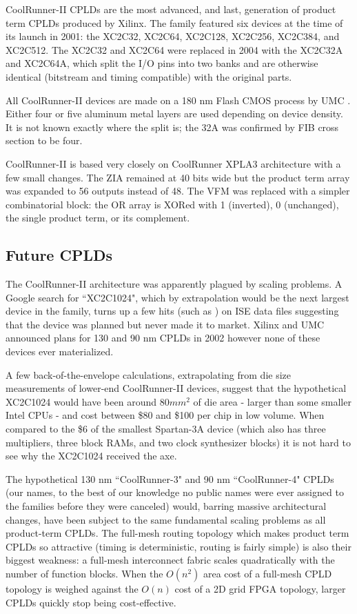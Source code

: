 \documentclass[pdftex,letterpaper]{article}
\begin{document}
CoolRunner-II CPLDs are the most advanced, and last, generation of product term CPLDs produced by Xilinx. The 
family featured six devices at the time of its launch in 2001: the XC2C32, XC2C64, XC2C128, XC2C256, XC2C384, 
and XC2C512. The XC2C32 and XC2C64 were replaced in 2004 with the XC2C32A and XC2C64A, which split the I/O pins 
into two banks and are otherwise identical (bitstream and timing compatible) with the original parts.

All CoolRunner-II devices are made on a 180 nm Flash CMOS process by UMC \cite{backgrounder}. Either four or five
aluminum metal layers are used depending on device density. It is not known exactly where the split is; the 32A was 
confirmed by FIB cross section to be four.

CoolRunner-II is based very closely on CoolRunner XPLA3 architecture with a few small changes. The ZIA remained at 
40 bits wide but the product term array was expanded to 56 outputs instead of 48. The VFM was replaced with a simpler 
combinatorial block: the OR array is XORed with 1 (inverted), 0 (unchanged), the single product term, or its 
complement.

\subsection{Future CPLDs}

The CoolRunner-II architecture was apparently plagued by scaling problems. A Google search for ``XC2C1024", 
which by extrapolation would be the next largest device in the family, turns up a few hits (such as \cite
{epldmodel}) on ISE data files suggesting that the device was planned but never made it to market. Xilinx and 
UMC announced plans for 130 and 90 nm CPLDs in 2002 \cite{roadmap} however none of these devices ever 
materialized.

A few back-of-the-envelope calculations, extrapolating from die size measurements of lower-end CoolRunner-II 
devices, suggest that the hypothetical XC2C1024 would have been around $80 mm^2$ of die area - larger than some 
smaller Intel CPUs - and cost between \$80 and \$100 per chip in low volume. When compared to the \$6 of the 
smallest Spartan-3A device (which also has three multipliers, three block RAMs, and two clock synthesizer blocks) it 
is not hard to see why the XC2C1024 received the axe.

The hypothetical 130 nm ``CoolRunner-3" and 90 nm ``CoolRunner-4" CPLDs (our names, to the best of our knowledge no 
public names were ever assigned to the families before they were canceled) would, barring massive architectural 
changes, have been subject to the same fundamental scaling problems as all product-term CPLDs. The full-mesh routing 
topology which makes product term CPLDs so attractive (timing is deterministic, routing is fairly simple) is also 
their biggest weakness: a full-mesh interconnect fabric scales quadratically with the number of function blocks. When 
the $O(n^2)$ area cost of a full-mesh CPLD topology is weighed against the $O(n)$ cost of a 2D grid FPGA topology, 
larger CPLDs quickly stop being cost-effective.
\end{document}
